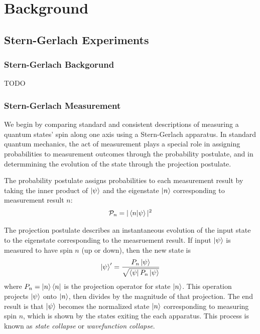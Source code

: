 \usetikzlibrary{shapes.geometric}
\usetikzlibrary{positioning}

\newcommand{\apparatus}[4]{\node[square node] (#1) at (#2,#3){#4};
                           \node[port] (#1+) at (#2 + 0.375, #3 + 0.5){+};
                           \node[port] (#1-) at (#2 + 0.375, #3 - 0.5){-};}

\part{Background}
\chapter{Stern-Gerlach Experiments}
\section{Stern-Gerlach Backgorund}
TODO
\section{Stern-Gerlach Measurement}

We begin by comparing standard and consistent descriptions of measuring a quantum states' spin along one axis using a Stern-Gerlach apparatus. In standard quantum mechanics, the act of measurement plays a special role in assigning probabilities to measurement outcomes through the probability postulate, and in determmining the evolution of the state through the projection postulate.

The probability postulate assigns probabilities to each measurement result by taking the inner product of $\ket{\psi}$ and the eigenstate $\ket{n}$ corresponding to measurement result $n$:
\begin{align}
    \mathcal{P}_n = |\braket{n|\psi}|^2
\end{align}

The projection postulate describes an instantaneous evolution of the input state to the eigenstate corresponding to the measruement result. If input $\ket{\psi}$ is measured to have spin $n$ (up or down), then the new state is
\begin{align}
    \ket{\psi}^\prime = \frac{P_n\ket{\psi}}{\sqrt{\bra{\psi}P_n\ket{\psi}
    }}
\end{align}
where $P_n = \ket{n}\bra{n}$ is the projection operator for state $\ket{n}$. This operation projects $\ket{\psi}$ onto $\ket{n}$, then divides by the magnitude of that projection. The end result is that $\ket{\psi}$ becomes the normalized state $\ket{n}$ corresponding to measuring spin $n$, which is shown by the states exiting the each apparatus. This process is known as \textit{state collapse} or \textit{wavefunction collapse}.

